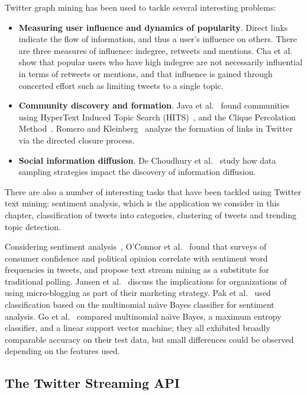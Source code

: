 Twitter graph mining has been used to tackle several interesting problems:
\begin{itemize}
 \item \textbf{Measuring user influence and dynamics of
   popularity}. Direct links indicate the flow of information, and
   thus a user's influence on others. There are three measures of
   influence: indegree, retweets and mentions. Cha et
   al.~\cite{icwsm10cha} show that popular users who have high
   indegree are not necessarily influential in terms of retweets or
   mentions, and that influence is gained through concerted effort
   such as limiting tweets to a single topic.
  \item \textbf{Community discovery and formation}. Java et
    al.~\cite{java} found communities using HyperText Induced Topic
    Search (HITS)~\cite{HITS}, and the Clique Percolation
    Method~\cite{CPM}.  Romero and Kleinberg~\cite{romero} analyze
    the formation of links in Twitter via the directed closure
    process.
  \item \textbf{Social information diffusion}. De Choudhury et
    al.~\cite{choudhury:sampling} study how data sampling strategies
    impact the discovery of information diffusion.
\end{itemize}

There are also a number of interesting tasks that have been tackled
using Twitter text mining: sentiment analysis, which is the
application we consider in this chapter, classification of tweets
into categories, clustering of tweets and trending topic detection.

Considering sentiment analysis~\cite{Liu:06a,Pang+Lee:08b}, O'Connor et al.~\cite{Oconnor10} found
that surveys of consumer confidence and political opinion correlate
with sentiment word frequencies in tweets, and propose text stream
mining as a substitute for traditional polling.  Jansen et
al.~\cite{Jansen} discuss the implications for organizations of using
micro-blogging as part of their marketing strategy.  Pak et
al.~\cite{PAK} used classification based on the multinomial na\"{\i}ve
Bayes classifier for sentiment analysis. Go et al.~\cite{gohuang}
compared multinomial na\"{\i}ve Bayes, a maximum entropy classifier,
and a linear support vector machine; they all exhibited broadly
comparable accuracy on their test data, but small differences could be
observed depending on the features used.


\subsection{The Twitter Streaming API} 
\label{sec:api}


